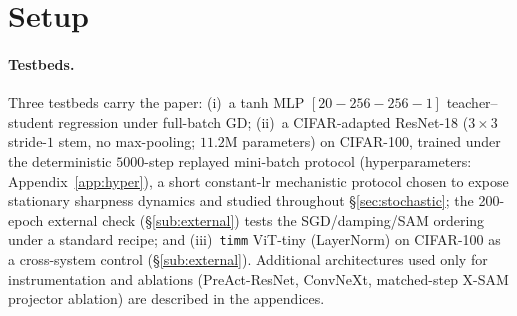 \documentclass{article}
\theoremstyle{plain}
\theoremstyle{definition}
\theoremstyle{remark}
\begin{document}
\section{Setup}
\label{sec:setup}
\paragraph{Testbeds.}
Three testbeds carry the paper: (i)~a tanh MLP
$[20\!-\!256\!-\!256\!-\!1]$ teacher--student regression under
full-batch GD; (ii)~a CIFAR-adapted ResNet-18 ($3{\times}3$ stride-$1$
stem, no max-pooling; $11.2$M parameters) on CIFAR-100, trained under
the deterministic $5000$-step replayed mini-batch protocol
(hyperparameters: Appendix~\ref{app:hyper}), a short constant-lr
mechanistic protocol chosen to expose
stationary sharpness dynamics and studied throughout
\S\ref{sec:stochastic}; the 200-epoch external check
(\S\ref{sub:external}) tests the SGD/damping/SAM ordering under a
standard recipe; and
(iii)~\texttt{timm} ViT-tiny (LayerNorm) on CIFAR-100 as a
cross-system control (\S\ref{sub:external}). Additional
architectures used only for instrumentation and ablations
(PreAct-ResNet, ConvNeXt, matched-step X-SAM projector ablation) are described in the
appendices.
\end{document}
